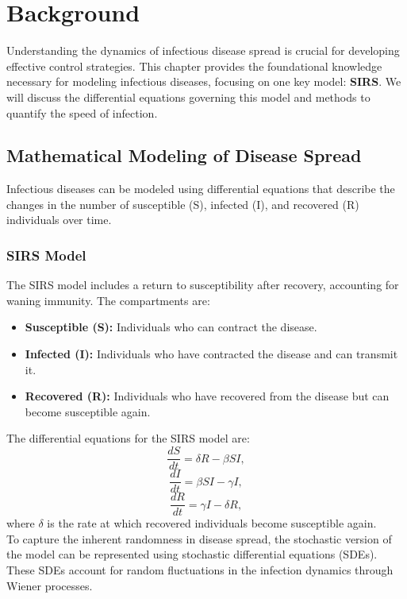 \chapter{Background}

Understanding the dynamics of infectious disease spread is crucial for developing effective control strategies. This chapter provides the foundational knowledge necessary for modeling infectious diseases, focusing on one key model: \textbf{SIRS}. We will discuss the differential equations governing this model and methods to quantify the speed of infection.

\section{Mathematical Modeling of Disease Spread}
Infectious diseases can be modeled using differential equations that describe the changes in the number of susceptible (S), infected (I), and recovered (R) individuals over time.

\subsection{SIRS Model}
The SIRS model includes a return to susceptibility after recovery, accounting for waning immunity. The compartments are:
\begin{itemize}
    \item \textbf{Susceptible (S):} Individuals who can contract the disease.
    \item \textbf{Infected (I):} Individuals who have contracted the disease and can transmit it.
    \item \textbf{Recovered (R):} Individuals who have recovered from the disease but can become susceptible again.
\end{itemize}
\noindent
The differential equations for the SIRS model are:
\begin{equation}
\frac{dS}{dt} = \delta R - \beta SI,
\end{equation}
\begin{equation}
\frac{dI}{dt} = \beta SI - \gamma I,
\end{equation}
\begin{equation}
\frac{dR}{dt} = \gamma I - \delta R,
\end{equation}
where $\delta$ is the rate at which recovered individuals become susceptible again.\\
\noindent
To capture the inherent randomness in disease spread, the stochastic version of the model can be represented using stochastic differential equations (SDEs). These SDEs account for random fluctuations in the infection dynamics through Wiener processes.

